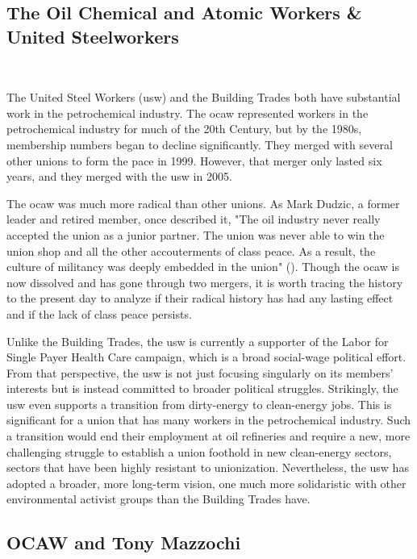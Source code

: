 \documentclass[12pt]{article}
\begin{document}
\subsection{The Oil Chemical and Atomic Workers \& United Steelworkers}\label{subsec:ocaw} \

The United Steel Workers (\acrshort{usw}) and the Building Trades both have substantial work in the petrochemical industry. The \acrfull{ocaw} represented workers in the petrochemical industry for much of the 20th Century, but by the 1980s, membership numbers began to decline significantly. They merged with several other unions to form the \acrfull{pace} in 1999. However, that merger only lasted six years, and they merged with the \acrshort{usw} in 2005.

The \acrshort{ocaw} was much more radical than other unions. As Mark Dudzic, a former leader and retired member, once described it, "The oil industry never really accepted the union as a junior partner. The union was never able to win the union shop and all the other accouterments of class peace. As a result, the culture of militancy was deeply embedded in the union" (\cite{leopoldManWhoHated2007}). Though the \acrshort{ocaw} is now dissolved and has gone through two mergers, it is worth tracing the history to the present day to analyze if their radical history has had any lasting effect and if the lack of class peace persists.

Unlike the Building Trades, the \acrshort{usw} is currently a supporter of the Labor for Single Payer Health Care campaign, which is a broad social-wage political effort. From that perspective, the \acrshort{usw} is not just focusing singularly on its members’ interests but is instead committed to broader political struggles. Strikingly, the \acrshort{usw} even supports a transition from dirty-energy to clean-energy jobs. This is significant for a union that has many workers in the petrochemical industry. Such a transition would end their employment at oil refineries and require a new, more challenging struggle to establish a union foothold in new clean-energy sectors, sectors that have been highly resistant to unionization. Nevertheless, the \acrshort{usw} has adopted a broader, more long-term vision, one much more solidaristic with other environmental activist groups than the Building Trades have.

\subsection{OCAW and Tony Mazzochi} \
\end{document}
